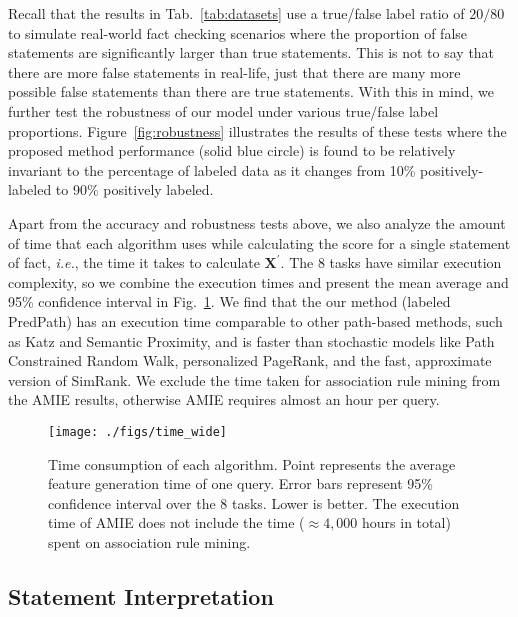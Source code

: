 \documentclass[reprint,twocolumn,showpacs,preprintnumbers,amsmath, aps,pre,amssymb]{revtex4-1}
\newcommand\ie{\emph{i.e.}}
\begin{document}
Recall that the results in Tab.~\ref{tab:datasets} use a true/false label ratio of $20/80$ to simulate real-world fact checking scenarios where the proportion of false statements are significantly larger than true statements. This is not to say that there are more false statements in real-life, just that there are many more possible false statements than there are true statements. With this in mind, we further test the robustness of our model under various true/false label proportions. Figure~\ref{fig:robustness} illustrates the results of these tests where the proposed method performance (solid blue circle) is found to be relatively invariant to the percentage of labeled data as it changes from 10\% positively-labeled to 90\% positively labeled.


Apart from the accuracy and robustness tests above, we also analyze the amount of time that each algorithm uses while calculating the score for a single statement of fact, \ie, the time it takes to calculate $\mathbf{X}^\prime$. The 8 tasks have similar execution complexity, so we combine the execution times and present the mean average and 95\% confidence interval in Fig.~\ref{fig:time}. We find that the our method (labeled PredPath) has an execution time comparable to other path-based methods, such as Katz and Semantic Proximity, and is faster than stochastic models like Path Constrained Random Walk, personalized PageRank, and the fast, approximate version of SimRank. We exclude the time taken for association rule mining from the AMIE results, otherwise AMIE requires almost an hour per query. 

\begin{figure}[t]
\centering
\texttt{[image: ./figs/time\_wide]}
\caption{Time consumption of each algorithm. Point represents the average feature generation time of one query. Error bars represent 95\% confidence interval over the 8 tasks. Lower is better. The execution time of AMIE does not include the time ($\approx 4,000$ hours in total) spent on association rule mining.}
\label{fig:time}
\end{figure}

\subsection{Statement Interpretation}
\end{document}
